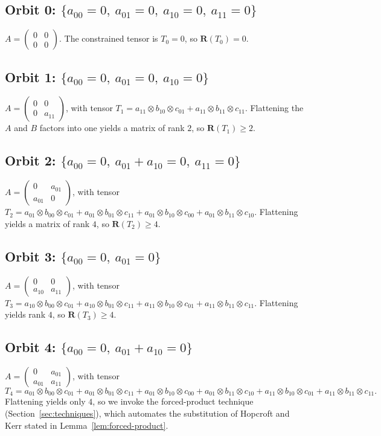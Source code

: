 \documentclass[11pt]{article}
\theoremstyle{definition}
\newcommand{\R}{\mathbf{R}}
\begin{document}
\subsection*{Orbit 0: $\{a_{00}=0,\ a_{01}=0,\ a_{10}=0,\ a_{11}=0\}$}
$A=
\begin{pmatrix}0 & 0 \\0&0
\end{pmatrix}$. The constrained tensor is $T_0=0$, so
$\R(T_0)=0$.

\subsection*{Orbit 1: $\{a_{00}=0,\ a_{01}=0,\ a_{10}=0\}$}
$A=
\begin{pmatrix}0 & 0 \\0&a_{11}
\end{pmatrix}$, with tensor
$T_1=a_{11}\otimes b_{10}\otimes c_{01}+a_{11}\otimes b_{11}\otimes c_{11}$.
Flattening the $A$ and $B$ factors into one yields a matrix of rank $2$, so
$\R(T_1)\ge 2$.

\subsection*{Orbit 2: $\{a_{00}=0,\ a_{01}+a_{10}=0,\ a_{11}=0\}$}
$A=
\begin{pmatrix}0 & a_{01} \\a_{01}&0
\end{pmatrix}$, with tensor
$T_2=a_{01}\otimes b_{00}\otimes c_{01}+a_{01}\otimes b_{01}\otimes c_{11}
+a_{01}\otimes b_{10}\otimes c_{00}+a_{01}\otimes b_{11}\otimes c_{10}$.
Flattening yields a matrix of rank $4$, so $\R(T_2)\ge 4$.

\subsection*{Orbit 3: $\{a_{00}=0,\ a_{01}=0\}$}
$A=
\begin{pmatrix}0 & 0 \\a_{10}&a_{11}
\end{pmatrix}$, with tensor
$T_3=a_{10}\otimes b_{00}\otimes c_{01}+a_{10}\otimes b_{01}\otimes c_{11}
+a_{11}\otimes b_{10}\otimes c_{01}+a_{11}\otimes b_{11}\otimes c_{11}$.
Flattening yields rank $4$, so $\R(T_3)\ge 4$.

\subsection*{Orbit 4: $\{a_{00}=0,\ a_{01}+a_{10}=0\}$}
$A=
\begin{pmatrix}0 & a_{01} \\a_{01}&a_{11}
\end{pmatrix}$, with tensor
\[
  T_4=a_{01}\otimes b_{00}\otimes c_{01}+a_{01}\otimes b_{01}\otimes c_{11}
  +a_{01}\otimes b_{10}\otimes c_{00}+a_{01}\otimes b_{11}\otimes c_{10}
  +a_{11}\otimes b_{10}\otimes c_{01}+a_{11}\otimes b_{11}\otimes c_{11}.
\]
Flattening yields only $4$, so we invoke the forced-product technique
(Section~\ref{sec:techniques}), which automates the substitution of Hopcroft and
Kerr stated in Lemma~\ref{lem:forced-product}.
\end{document}
